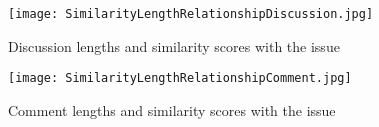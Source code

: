 \begin{figure}[H]%
    \centering
	\texttt{[image: SimilarityLengthRelationshipDiscussion.jpg]}
    \caption{Discussion lengths and similarity scores with the issue}%
    \label{fig:SimilarityLengthRelationshipDiscussion}%
\end{figure}

\begin{figure}[H]%
    \centering
	\texttt{[image: SimilarityLengthRelationshipComment.jpg]}
    \caption{Comment lengths and similarity scores with the issue}%
    \label{fig:SimilarityLengthRelationshipComment}%
\end{figure}


